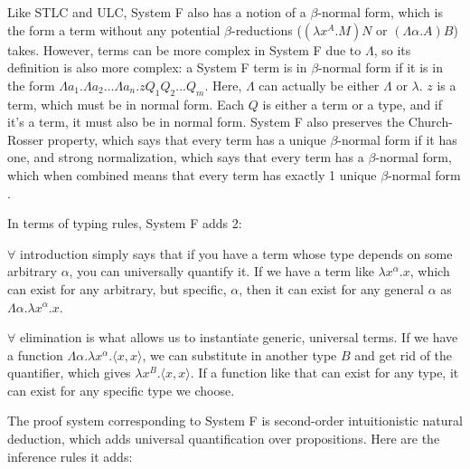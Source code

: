 \documentclass[12pt]{article}
\begin{document}
Like STLC and ULC, System F also has a notion of a $\beta$-normal form, which is the form a term without any potential $\beta$-reductions ($(\lambda x^A.M)N$ or $(\Lambda \alpha.A)B$) takes. However, terms can be more complex in System F due to $\Lambda$, so its definition is also more complex: a System F term is in $\beta$-normal form if it is in the form $\Lambda a_1. \Lambda a_2... \Lambda a_n. zQ_1Q_2...Q_m$. Here, $\Lambda$ can actually be either $\Lambda$ or $\lambda$. $z$ is a term, which must be in normal form. Each $Q$ is either a term or a type, and if it's a term, it must also be in normal form. System F also preserves the Church-Rosser property, which says that every term has a unique $\beta$-normal form if it has one, and strong normalization, which says that every term has a $\beta$-normal form, which when combined means that every term has exactly 1 unique $\beta$-normal form \cite{selinger}.

In terms of typing rules, System F adds 2:

\begin{prooftree}
\end{prooftree}

\begin{prooftree}
\end{prooftree}

$\forall$ introduction simply says that if you have a term whose type depends on some arbitrary $\alpha$, you can universally quantify it. If we have a term like $\lambda x^\alpha.x$, which can exist for any arbitrary, but specific, $\alpha$, then it can exist for any general $\alpha$ as $\Lambda \alpha. \lambda x^\alpha. x$.

$\forall$ elimination is what allows us to instantiate generic, universal terms. If we have a function $\Lambda \alpha. \lambda x^\alpha. \langle x, x \rangle$, we can substitute in another type $B$ and get rid of the quantifier, which gives $\lambda x^B. \langle x, x \rangle$. If a function like that can exist for any type, it can exist for any specific type we choose.

The proof system corresponding to System F is second-order intuitionistic natural deduction, which adds universal quantification over propositions. Here are the inference rules it adds:
\end{document}
